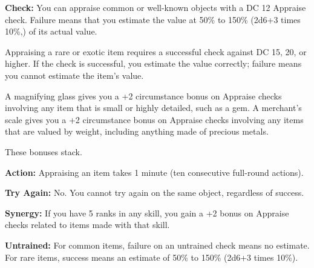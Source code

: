 
\textbf{Check:} You can appraise common or well-known objects with a DC 12 Appraise check. Failure means that you estimate the value at 50\% to 150\% (2d6+3 times 10\%,) of its actual value.

Appraising a rare or exotic item requires a successful check against DC 15, 20, or higher. If the check is successful, you estimate the value correctly; failure means you cannot estimate the item's value.

A magnifying glass gives you a +2 circumstance bonus on Appraise checks involving any item that is small or highly detailed, such as a gem. A merchant's scale gives you a +2 circumstance bonus on Appraise checks involving any items that are valued by weight, including anything made of precious metals.

These bonuses stack.

\textbf{Action:} Appraising an item takes 1 minute (ten consecutive full-round actions).

\textbf{Try Again:} No. You cannot try again on the same object, regardless of success.

\textbf{Synergy:} If you have 5 ranks in any  skill, you gain a +2 bonus on Appraise checks related to items made with that  skill.

\textbf{Untrained:} For common items, failure on an untrained check means no estimate. For rare items, success means an estimate of 50\% to 150\% (2d6+3 times 10\%).
